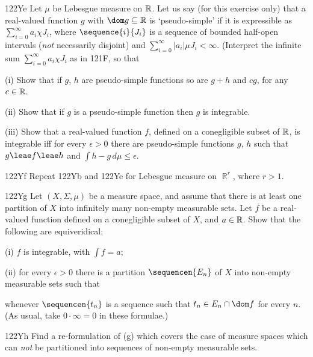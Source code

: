 {\spheader 122Ye Let $\mu$ be Lebesgue measure on $\Bbb R$.   Let
us say (for this exercise only) that a real-valued function $g$ with
$\dom
g\subseteq\Bbb R$ is `pseudo-simple' if it is expressible as
$\sum_{i=0}^{\infty}a_i\chi J_i$, where $\sequence{i}{J_i}$ is a
sequence
of bounded half-open intervals ({\it not} necessarily disjoint) and
$\sum_{i=0}^{\infty}|a_i|\mu J_i<\infty$.    (Interpret the infinite
sum
$\sum_{i=0}^{\infty}a_i\chi J_i$ as in 121F, so that


\quad(i) Show that if $g$, $h$ are pseudo-simple functions so are
$g+h$
and $cg$, for any $c\in \Bbb R$.

\quad(ii) Show that if $g$ is a pseudo-simple function then $g$ is
integrable.

\quad(iii) Show that a real-valued function $f$, defined on a
conegligible subset of $\Bbb R$, is integrable iff for every
$\epsilon>0$
there are pseudo-simple functions $g$, $h$ such that $g\leae f\leae h$
and $\int h-g\,d\mu\le\epsilon$.   

\spheader 122Yf Repeat 122Yb and 122Ye for Lebesgue measure on
$\BbbR^r$,
where $r>1$.

\spheader 122Yg Let $(X,\Sigma,\mu)$ be a measure space, and
assume that there is at least one partition of $X$ into infinitely
many
non-empty measurable sets.   Let $f$ be a real-valued function
defined on a conegligible subset of $X$, and $a\in\Bbb R$.   Show that
the following are equiveridical:

\quad (i) $f$ is integrable, with $\int f=a$;

\quad (ii) for every $\epsilon>0$ there is a partition
$\sequencen{E_n}$
of $X$ into non-empty measurable sets such that


\noindent whenever $\sequencen{t_n}$ is a sequence such that
$t_n\in E_n\cap\dom f$ for every $n$.   (As usual, take
$0\cdot\infty=0$ in these formulae.)  

\spheader 122Yh Find a re-formulation of (g) which covers the case
of measure spaces which can {\it not} be partitioned into sequences of
non-empty measurable sets.

}
